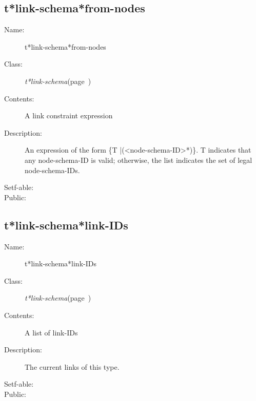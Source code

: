 \subsection{t*link-schema*from-nodes}
\label{t*link-schema*from-nodes}

\begin{description}
\item [Name:]  t*link-schema*from-nodes

\item [Class:] {\sl t*link-schema}\hfill(page~\pageref{t*link-schema})

\item [Contents:] A link constraint expression

\item [Description:]

An expression of the form \{T |(<node-schema-ID>*)\}.
T indicates that any node-schema-ID is valid; otherwise,
the list indicates the set of legal node-schema-IDs.

\item [Setf-able:]


\item [Public:]



\end{description}
\horizontalline

\subsection{t*link-schema*link-IDs}
\label{t*link-schema*link-IDs}

\begin{description}
\item [Name:]  t*link-schema*link-IDs

\item [Class:] {\sl t*link-schema}\hfill(page~\pageref{t*link-schema})

\item [Contents:] A list of link-IDs

\item [Description:]

The current links of this type.

\item [Setf-able:]


\item [Public:]



\end{description}
\horizontalline

